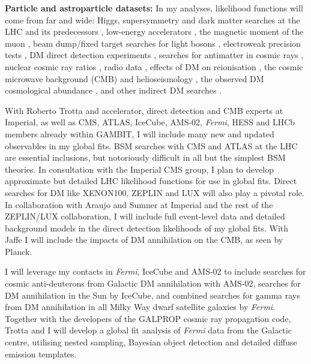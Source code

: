 \documentclass[a4paper,11pt]{article}
\begin{document}
\textbf{Particle and astroparticle datasets:}
In my analyses, likelihood functions will come from far and wide: Higgs, supersymmetry and dark matter searches at the LHC and its predecessors \cite{CMS_SUSY_alphaT_13,CMS_Exotic_monojet_12,CMS_SUSY_razor_12,CMS_Higgs_discovery,ATLAS_Exotic_monojet_13,ATLAS_Higgs_diboson_13, ATLAS_Higgs_discovery,ATLAS_SUSY_all_12,ATLAS_SUSY_0lep_12,LHCb_Bmumu_13}, low-energy accelerators \cite{HFAG07, CDFBmixinga, CDFBmixingb, CDFBmumu11}, the magnetic moment of the muon \cite{g-2}, beam dump/fixed target searches for light bosons \cite{Batell09,Bjorken09}, electroweak precision tests \cite{PDG}, DM direct detection experiments \cite{Bernabei08,CDMS2event,CDMSIILowE,XENON100,CoGeNTAnnMod11,CRESST11,SIMPLE11,ZEPLINIII,COUPP12,CDMS2013A,CDMS2013B,XENON2013}, searches for antimatter in cosmic rays \cite{Pamelaantiproton10,Choutko02,Pamelaelectron11,Pamelapositron,Hailey09,Choutko08,AMSpositron}, nuclear cosmic ray ratios \cite{CREAM1pHe,AMS_BC}, radio data \cite{Regis08, Bergstrom09_MW}, effects of DM on reionisation \cite{Natarajan10,Cirelli09b}, the cosmic microwave background (CMB) \cite{Slatyer09, Galli09, Finkbeiner12, Slatyer13, Cline13, Lopez13, Galli13} and helioseismology \cite{Taoso10}, the observed DM cosmological abundance \cite{PlanckCosmology}, and other indirect DM searches \cite{IceCube09,Scott09c,LATcosmowimp,HESSdwarfs, MAGICSegue, VERITAS10, LATDwarfComposite, CompositeAlt, Weniger130GeV}.  

With Roberto Trotta and accelerator, direct detection and CMB experts at Imperial, as well as CMS, ATLAS, IceCube, AMS-02, \textit{Fermi}, HESS and LHCb members already within GAMBIT, I will include many new and updated observables in my global fits.  BSM searches with CMS and ATLAS at the LHC are essential inclusions, but notoriously difficult in all but the simplest BSM theories.  In consultation with the Imperial CMS group, I plan to develop approximate but detailed LHC likelihood functions for use in global fits.  Direct searches for DM like XENON100, ZEPLIN and LUX will also play a pivotal role.  In collaboration with Araujo and Sumner at Imperial and the rest of the ZEPLIN/LUX collaboration, I will include full event-level data and detailed background models in the direct detection likelihoods of my global fits.  With Jaffe I will include the impacts of DM annihilation on the CMB, as seen by Planck.

I will leverage my contacts in \textit{Fermi}, IceCube and AMS-02 to include searches for cosmic anti-deuterons from Galactic DM annihilation with AMS-02, searches for DM annihilation in the Sun by IceCube, and combined searches for gamma rays from DM annihilation in all Milky Way dwarf satellite galaxies by \textit{Fermi}.   Together with the developers of the \textsf{GALPROP} \cite{Strong98,Moskalenko98} cosmic ray propagation code, Trotta and I will develop a global fit analysis of \textit{Fermi} data from the Galactic centre, utilising nested sampling, Bayesian object detection and detailed diffuse emission templates.
\end{document}
